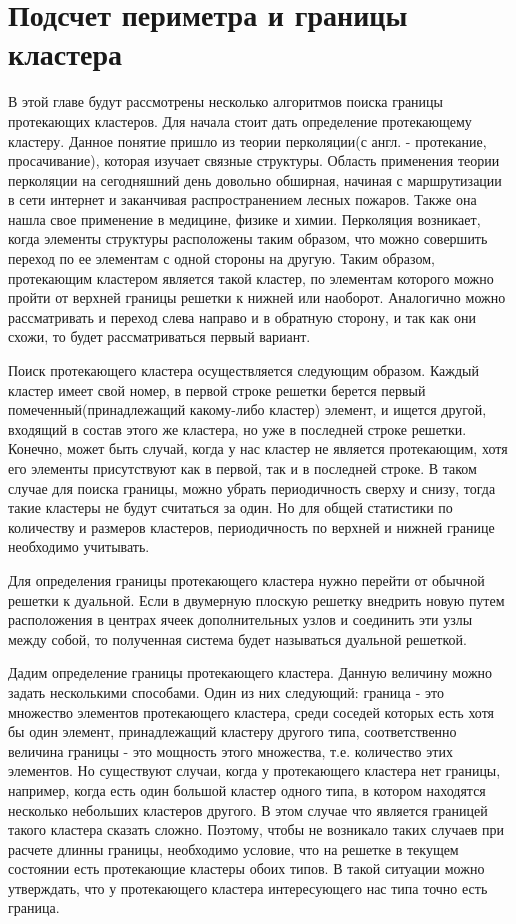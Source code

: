\documentclass[14pt]{article}
\begin{document}
\section{Подсчет периметра и границы кластера}
\par В этой главе будут рассмотрены несколько алгоритмов поиска границы протекающих кластеров. Для начала стоит дать определение протекающему кластеру. Данное понятие пришло из теории перколяции(с англ. - протекание, просачивание), которая изучает связные структуры. Область применения теории перколяции на сегодняшний день довольно обширная, начиная с маршрутизации в сети интернет и заканчивая распространением лесных пожаров. Также она нашла свое применение в медицине, физике и химии. Перколяция возникает, когда элементы структуры расположены таким образом, что можно совершить переход по ее элементам с одной стороны на другую. Таким образом, протекающим кластером является такой кластер, по элементам которого можно пройти от верхней границы решетки к нижней или наоборот. Аналогично можно рассматривать и переход слева направо и в обратную сторону, и так как они схожи, то будет рассматриваться первый вариант.
\par Поиск протекающего кластера осуществляется следующим образом. Каждый кластер имеет свой номер, в первой строке решетки берется первый помеченный(принадлежащий какому-либо кластер) элемент, и ищется другой, входящий в состав этого же кластера, но уже в последней строке решетки. Конечно, может быть случай, когда у нас кластер не является протекающим, хотя его элементы присутствуют как в первой, так и в последней строке. В таком случае для поиска границы, можно убрать периодичность сверху и снизу, тогда такие кластеры не будут считаться за один. Но для общей статистики по количеству и размеров кластеров, периодичность по верхней и нижней границе необходимо учитывать.
\par Для определения границы протекающего кластера нужно перейти от обычной решетки к дуальной. Если в двумерную плоскую решетку внедрить новую путем расположения в  центрах ячеек дополнительных узлов и соединить эти узлы между собой, то полученная система будет называться дуальной решеткой. 
\par Дадим определение границы протекающего кластера. Данную величину можно задать несколькими способами. Один из них следующий: граница - это множество элементов протекающего кластера, среди соседей которых есть хотя бы один элемент, принадлежащий кластеру другого типа, соответственно величина границы - это мощность этого множества, т.е. количество этих элементов. Но существуют случаи, когда у протекающего кластера нет границы, например, когда есть один большой кластер одного типа, в котором находятся несколько небольших кластеров другого. В этом случае что является границей такого кластера сказать сложно. Поэтому, чтобы не возникало таких случаев при расчете длинны границы, необходимо условие, что на решетке в текущем состоянии есть протекающие кластеры обоих типов. В такой ситуации можно утверждать, что у протекающего кластера интересующего нас типа точно есть граница.
\end{document}
